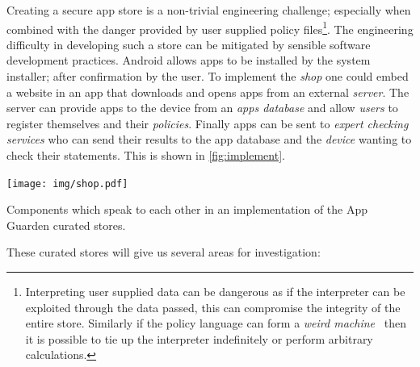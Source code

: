 \documentclass[a4paper,sfsidenotes]{%
  article%
}
\begin{document}
Creating a secure app store is a non-trivial engineering challenge; especially
when combined with the danger provided by user supplied policy
files\footnote{Interpreting user supplied data can be dangerous as if the
  interpreter can be exploited through the data passed, this can compromise the
  integrity of the entire store.  Similarly if the policy language can form a
  \emph{weird machine}~\cite{Bratus:2011wr} then it is possible to tie up the
interpreter indefinitely or perform arbitrary calculations.}. The engineering
difficulty in developing such a store can be mitigated by sensible software
development practices.  Android allows apps to be installed by the system
installer; after confirmation by the user.  To implement the \emph{shop} one
could embed a website in an app that downloads and opens apps from an external
\emph{server}.  The server can provide apps to the device from an \emph{apps
database} and allow \emph{users} to register themselves and their
\emph{policies}.  Finally apps can be sent to \emph{expert checking services}
who can send their results to the app database and the \emph{device} wanting to
check their statements.  This is shown in \autoref{fig:implement}.

\begin{marginfigure}
  \texttt{[image: img/shop.pdf]}
  \caption{Components which speak to each other in an implementation of the App
  Guarden curated stores.}
  \label{fig:implement}
\end{marginfigure}

These curated stores will give us several areas for investigation:
\end{document}
